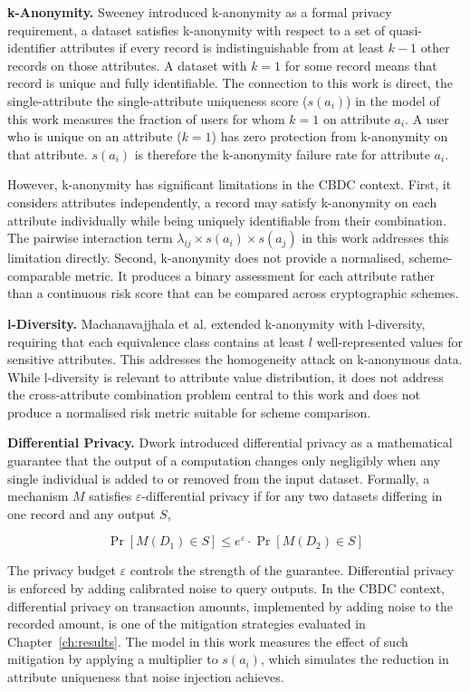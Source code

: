\textbf{k-Anonymity.} Sweeney \cite{sweeney2002}
introduced k-anonymity as a formal privacy requirement, a
dataset satisfies k-anonymity with respect to a set of
quasi-identifier attributes if every record is
indistinguishable from at least $k-1$ other records on
those attributes. A dataset with $k=1$ for some record
means that record is unique and fully identifiable. The
connection to this work is direct, the single-attribute
the single-attribute uniqueness score ($s(a_i)$) in the model of this work
measures the fraction of users for whom $k=1$ on attribute
$a_i$. A user who is unique on an attribute ($k=1$)
has zero protection from k-anonymity on that attribute.
$s(a_i)$ is therefore the k-anonymity failure rate for
attribute $a_i$.

However, k-anonymity has significant limitations in the
CBDC context. First, it considers attributes independently,
a record may satisfy k-anonymity on each attribute
individually while being uniquely identifiable from their
combination. The pairwise interaction term
$\lambda_{ij} \times s(a_i) \times s(a_j)$ in this work
addresses this limitation directly. Second, k-anonymity
does not provide a normalised, scheme-comparable metric.
It produces a binary assessment for each attribute rather
than a continuous risk score that can be compared across
cryptographic schemes.

\textbf{l-Diversity.} Machanavajjhala et al.
\cite{machanavajjhala2007} extended k-anonymity with
l-diversity, requiring that each equivalence class contains
at least $l$ well-represented values for sensitive
attributes. This addresses the homogeneity attack on
k-anonymous data. While l-diversity is relevant to
attribute value distribution, it does not address the
cross-attribute combination problem central to this work
and does not produce a normalised risk metric suitable for
scheme comparison.

\textbf{Differential Privacy.} Dwork \cite{dwork2006}
introduced differential privacy as a mathematical guarantee
that the output of a computation changes only negligibly
when any single individual is added to or removed from the
input dataset. Formally, a mechanism $M$ satisfies
$\varepsilon$-differential privacy if for any two datasets
differing in one record and any output $S$,

\begin{equation}
\Pr[M(D_1) \in S] \leq e^\varepsilon \cdot \Pr[M(D_2) \in S]
\end{equation}

The privacy budget $\varepsilon$ controls the strength of
the guarantee. Differential privacy is enforced by adding
calibrated noise to query outputs. In the CBDC context,
differential privacy on transaction amounts, implemented
by adding noise to the recorded amount, is one of the
mitigation strategies evaluated in Chapter~\ref{ch:results}.
The model in this work measures the effect of such
mitigation by applying a multiplier to $s(a_i)$, which
simulates the reduction in attribute uniqueness that noise
injection achieves.

